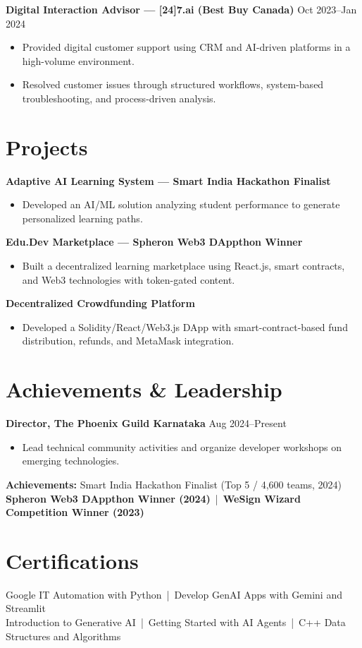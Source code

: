 \documentclass[a4paper,9pt]{article}
\begin{document}
\textbf{Digital Interaction Advisor --- [24]7.ai (Best Buy Canada)}
\hfill Oct 2023--Jan 2024
\begin{itemize}
    \item Provided digital customer support using CRM and AI-driven platforms
    in a high-volume environment.
    \item Resolved customer issues through structured workflows,
    system-based troubleshooting, and process-driven analysis.
\end{itemize}

\section{Projects}

\textbf{Adaptive AI Learning System --- Smart India Hackathon Finalist}
\begin{itemize}
    \item Developed an AI/ML solution analyzing student performance to
    generate personalized learning paths.
\end{itemize}

\textbf{Edu.Dev Marketplace --- Spheron Web3 DAppthon Winner}
\begin{itemize}
    \item Built a decentralized learning marketplace using React.js,
    smart contracts, and Web3 technologies with token-gated content.
\end{itemize}

\textbf{Decentralized Crowdfunding Platform}
\begin{itemize}
    \item Developed a Solidity/React/Web3.js DApp with smart-contract-based
    fund distribution, refunds, and MetaMask integration.
\end{itemize}

\section{Achievements \& Leadership}

\textbf{Director, The Phoenix Guild Karnataka}
\hfill Aug 2024--Present
\begin{itemize}
    \item Lead technical community activities and organize developer workshops
    on emerging technologies.
\end{itemize}

\textbf{Achievements:} Smart India Hackathon Finalist (Top 5 / 4,600 teams, 2024)
\\
\textbf{Spheron Web3 DAppthon Winner (2024)}
\,|\, \textbf{WeSign Wizard Competition Winner (2023)}

\section{Certifications}

Google IT Automation with Python
\,|\, Develop GenAI Apps with Gemini and Streamlit
\\
Introduction to Generative AI
\,|\, Getting Started with AI Agents
\,|\, C++ Data Structures and Algorithms
\end{document}
